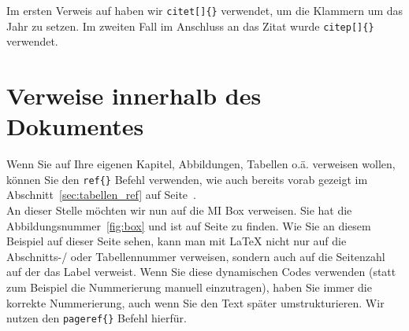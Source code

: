 Im ersten Verweis auf \citeauthor{Baddeley:1974ts} haben wir \texttt{citet[]\{\}} verwendet, um die Klammern um das Jahr zu setzen. Im zweiten Fall im Anschluss an das Zitat wurde \texttt{citep[]\{\}} verwendet.

\section{Verweise innerhalb des Dokumentes} %
\label{sec:verweise_im_dokument}

Wenn Sie auf Ihre eigenen Kapitel, Abbildungen, Tabellen o.ä. verweisen wollen, können Sie den \texttt{ref\{\}} Befehl verwenden, wie auch bereits vorab gezeigt im Abschnitt~\ref{sec:tabellen_ref} auf Seite~\pageref{sec:tabellen_ref}.  \\

An dieser Stelle möchten wir nun auf die MI Box verweisen. Sie hat die Abbildungsnummer~\ref{fig:box} und ist auf Seite \pageref{fig:box} zu finden. Wie Sie an diesem Beispiel auf dieser Seite sehen, kann man mit \LaTeX{} nicht nur auf die Abschnitts-/ oder Tabellennummer verweisen, sondern auch auf die Seitenzahl auf der das Label verweist. Wenn Sie diese dynamischen Codes verwenden (statt zum Beispiel die Nummerierung manuell einzutragen), haben Sie immer die korrekte Nummerierung, auch wenn Sie den Text später umstrukturieren. Wir nutzen den \texttt{pageref\{\}} Befehl hierfür.




